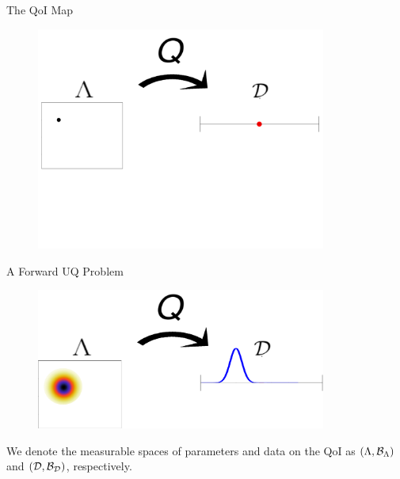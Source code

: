 \begin{frame}{The QoI Map}
{\begin{figure}[h]
	\includegraphics[width=0.85\textwidth]{./figures/threelevels/schematic_lambda_data_level1}
\end{figure}

}

\end{frame}

\begin{frame}{A Forward UQ Problem}

\begin{figure}[h]
	\includegraphics[width=0.85\textwidth]{./figures/threelevels/schematic_lambda_data_level3}
\end{figure}

{We denote the measurable spaces of parameters and data on the QoI as $({\Lambda},\mathcal{B}_{{\Lambda}})$ and $(\mathcal{D},\mathcal{B}_{\mathcal{D}})$, respectively.}
\bigskip


\end{frame}

